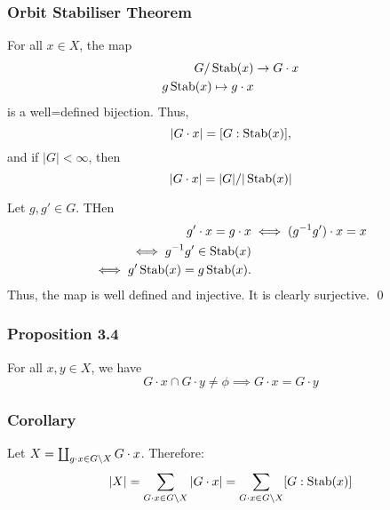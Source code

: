 \documentclass{article}
\renewenvironment{proof}{{\bfseries\color{blue1} Proof:}}{\qed}
\begin{document}
\subsubsection{Orbit Stabiliser Theorem}
\begin{idea}
    For all $x\in X$, the map
    \begin{align*}
        G/\operatorname{Stab}(x) & \rightarrow G\cdot x \\
        g\operatorname{Stab}(x) \mapsto g\cdot x
    \end{align*}
    is a well=defined bijection. Thus,
    \begin{equation*}
        |G\cdot x| = [G:\operatorname{Stab}(x)],
    \end{equation*}
    and if $|G|<\infty$, then
    \begin{equation*}
        |G\cdot x| = |G|/|\operatorname{Stab}(x)|
    \end{equation*}
\end{idea}
\begin{proof}
    Let $g,g'\in G$. THen
    \begin{align*}
        g'\cdot x = g\cdot x & \iff (g^{-1}g')\cdot x = x \\
        \iff g^{-1}g' \in \operatorname{Stab}(x)                        \\
        \iff g'\operatorname{Stab}(x) = g\operatorname{Stab}(x).
    \end{align*}
    Thus, the map is well defined and injective. It is clearly surjective.
\end{proof}
\subsubsection{Proposition 3.4}
\begin{idea}
    For all $x,y\in X$, we have
    \begin{equation*}
        G\cdot x \cap G\cdot y \neq \phi \implies G\cdot x = G\cdot y
    \end{equation*}
\end{idea}
\subsubsection{Corollary}
\begin{idea}
    Let $X=\coprod_{g\cdot x \in G \text{\textbackslash} X} G\cdot x$. Therefore:
    \begin{equation*}
        |X|=\sum_{G\cdot x\in G\text{\textbackslash} X}|G\cdot x| = \sum_{G\cdot x\in G\text{\textbackslash} X}[G:\operatorname{Stab}(x)]
    \end{equation*}
\end{idea}
\end{document}
